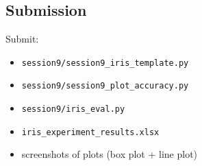 \subsection{Submission}
Submit:
\begin{itemize}\setlength{\itemsep}{0pt}
\item \texttt{session9/session9\_iris\_template.py}
\item \texttt{session9/session9\_plot\_accuracy.py}
\item \texttt{session9/iris\_eval.py}
\item \texttt{iris\_experiment\_results.xlsx}
\item screenshots of plots (box plot + line plot)
\end{itemize}
